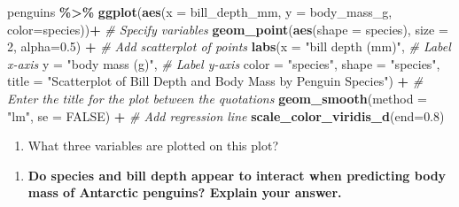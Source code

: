 \documentclass[
]{report}
\newenvironment{Shaded}{\begin{snugshade}}{\end{snugshade}}
\newcommand{\AttributeTok}[1]{\textcolor[rgb]{0.13,0.29,0.53}{#1}}
\newcommand{\CommentTok}[1]{\textcolor[rgb]{0.56,0.35,0.01}{\textit{#1}}}
\newcommand{\ConstantTok}[1]{\textcolor[rgb]{0.56,0.35,0.01}{#1}}
\newcommand{\DecValTok}[1]{\textcolor[rgb]{0.00,0.00,0.81}{#1}}
\newcommand{\FloatTok}[1]{\textcolor[rgb]{0.00,0.00,0.81}{#1}}
\newcommand{\FunctionTok}[1]{\textcolor[rgb]{0.13,0.29,0.53}{\textbf{#1}}}
\newcommand{\NormalTok}[1]{#1}
\newcommand{\SpecialCharTok}[1]{\textcolor[rgb]{0.81,0.36,0.00}{\textbf{#1}}}
\newcommand{\StringTok}[1]{\textcolor[rgb]{0.31,0.60,0.02}{#1}}
\providecommand{\tightlist}{%
  \setlength{\itemsep}{0pt}\setlength{\parskip}{0pt}}
\begin{document}
\begin{Shaded}
\begin{Highlighting}[]
\NormalTok{penguins }\SpecialCharTok{\%\textgreater{}\%}
  \FunctionTok{ggplot}\NormalTok{(}\FunctionTok{aes}\NormalTok{(}\AttributeTok{x =}\NormalTok{ bill\_depth\_mm, }\AttributeTok{y =}\NormalTok{ body\_mass\_g, }\AttributeTok{color=}\NormalTok{species))}\SpecialCharTok{+}  \CommentTok{\# Specify variables}
  \FunctionTok{geom\_point}\NormalTok{(}\FunctionTok{aes}\NormalTok{(}\AttributeTok{shape =}\NormalTok{ species), }\AttributeTok{size =} \DecValTok{2}\NormalTok{, }\AttributeTok{alpha=}\FloatTok{0.5}\NormalTok{) }\SpecialCharTok{+}  \CommentTok{\# Add scatterplot of points}
  \FunctionTok{labs}\NormalTok{(}\AttributeTok{x =} \StringTok{"bill depth (mm)"}\NormalTok{,  }\CommentTok{\# Label x{-}axis}
       \AttributeTok{y =} \StringTok{"body mass (g)"}\NormalTok{,  }\CommentTok{\# Label y{-}axis}
       \AttributeTok{color =} \StringTok{"species"}\NormalTok{,}
       \AttributeTok{shape =} \StringTok{"species"}\NormalTok{,}
       \AttributeTok{title =} \StringTok{"Scatterplot of Bill Depth and Body Mass by Penguin Species"}\NormalTok{) }\SpecialCharTok{+} 
    \CommentTok{\# Enter the title for the plot between the quotations}
  \FunctionTok{geom\_smooth}\NormalTok{(}\AttributeTok{method =} \StringTok{"lm"}\NormalTok{, }\AttributeTok{se =} \ConstantTok{FALSE}\NormalTok{) }\SpecialCharTok{+}  \CommentTok{\# Add regression line}
  \FunctionTok{scale\_color\_viridis\_d}\NormalTok{(}\AttributeTok{end=}\FloatTok{0.8}\NormalTok{)}
\end{Highlighting}
\end{Shaded}

\begin{enumerate}
\def\labelenumi{\arabic{enumi}.}
\setcounter{enumi}{9}
\tightlist
\item
  What three variables are plotted on this plot?
\end{enumerate}

\vspace{0.3in}

\begin{enumerate}
\def\labelenumi{\arabic{enumi}.}
\setcounter{enumi}{10}
\tightlist
\item
  \textbf{Do species and bill depth appear to interact when predicting body mass of Antarctic penguins? Explain your answer.}
\end{enumerate}

\vspace{0.5in}
\end{document}

